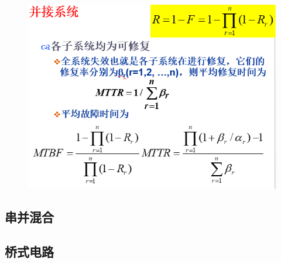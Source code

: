 \begin{figure}[H]
	\centering
	\includegraphics[width=0.7\linewidth]{figures/screenshot097}
	\caption{}
	\label{fig:screenshot097}
\end{figure}
\subsection{串并混合}
\subsection{桥式电路}

